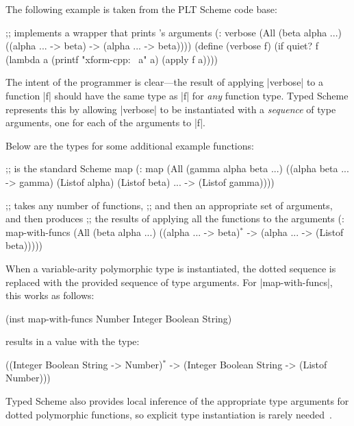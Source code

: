 \begin{schemeregion}
The following example is taken from the PLT Scheme code base:
\begin{exmp}
\begin{schemedisplay}
;; implements a wrapper that prints 's arguments
(: verbose (All (beta alpha ...) ((alpha ... -> beta) -> (alpha ... -> beta))))
(define (verbose f)
  (if quiet? f (lambda a (printf "xform-cpp: ~a\n" a) (apply f a))))
\end{schemedisplay}
\end{exmp}
The intent of the programmer is clear---the result of applying
\scheme|verbose| to a function \scheme|f| should have the same type as
\scheme|f| for {\em any} function type. Typed Scheme represents this
by allowing \scheme|verbose| to be instantiated with a \emph{sequence}
of type arguments, one for each of the arguments to \scheme|f|.

Below are the types for some additional example functions:
\begin{exmp}
\begin{schemedisplay}
;;  is the standard Scheme map
(: map 
   (All (gamma alpha beta ...) 
     ((alpha beta ... -> gamma) (Listof alpha) (Listof beta) ... -> (Listof gamma))))
\end{schemedisplay}
\label{ex:map-dots}
\end{exmp}
\begin{exmp}
\begin{schemedisplay}
;;  takes any number of functions, 
;; and then an appropriate set of arguments, and then produces 
;; the results of applying all the functions to the arguments
(: map-with-funcs
   (All (beta alpha ...) ((alpha ... -> beta)$^*$ -> (alpha ... -> (Listof beta)))))
\end{schemedisplay}
\label{ex:map-func-dots}
\end{exmp}

When a variable-arity polymorphic type is instantiated, the dotted
sequence is replaced with the provided sequence of type arguments.
For \scheme|map-with-funcs|, this works as follows:
\begin{schemedisplay}
  (inst map-with-funcs Number Integer Boolean String)
\end{schemedisplay}
results in a value with the type:
\begin{schemedisplay}
  ((Integer Boolean String -> Number)$^*$ -> 
  (Integer Boolean String -> (Listof Number)))
\end{schemedisplay}
Typed Scheme also provides local inference of the appropriate type
arguments for dotted polymorphic functions, so explicit type
instantiation is rarely needed~\cite{dots-tr}. 


\end{schemeregion}
